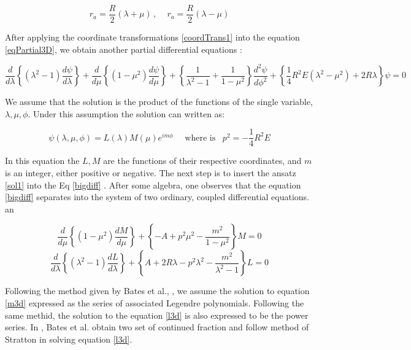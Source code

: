 \begin{equation}\label{coordTrans1}
r_a = \frac{R}{2}(\lambda + \mu)\,,\,\,\,\,\,\,\,r_a = \frac{R}{2}(\lambda - \mu)
\end{equation}

After applying the coordinate transformations \eqref{coordTrans1} into the equation \eqref {eqPartial3D}, we obtain another partial differential equations \cite{Bates1}:

\begin{equation}\label{bigdiff}
\frac{d}{d\lambda}\left\{(\lambda^2-1)\frac{d\psi}{d\lambda}\right\} +\frac{d}{d\mu}\left\{(1-\mu^2)\frac{d\psi}{d\mu}\right\} + \left\{\frac{1}{\lambda^2-1} + \frac{1}{1-\mu^2} \right\}\frac{d^2\psi}{d\phi^2}+ \left\{\frac{1}{4}R^2E(\lambda^2 - \mu^2) + 2R\lambda \right\}\psi = 0
\end{equation}

We assume that the solution is the product of the functions of the single variable, $\lambda,\mu, \phi $. Under this assumption the solution can written as:

\begin{equation}\label{sol1}
\psi(\lambda, \mu, \phi) = L(\lambda)M(\mu)e^{im\phi}\,\,\,\,\,\,\text{ where is }\,\,\,p^2 = -\frac{1}{4}R^2E
\end{equation}

In this equation the $ L, M $ are the functions of their respective coordinates, and $ m $ is an integer, either positive or negative. The next step is to insert the ansatz \eqref{sol1} into the Eq \eqref{bigdiff} .  After some algebra, one observes that the equation \eqref{bigdiff} separates into the system of two ordinary, coupled differential equations.
an

\begin{equation}\label{m3d}
\frac{d}{d\mu}\left\{(1-\mu^2)\frac{dM}{d\mu}\right\} + \left\{-A + p^2\mu^2 -\frac{m^2}{1-\mu^2} \right\}M = 0 
\end{equation}
\begin{equation}\label{l3d}
\frac{d}{d\lambda}\left\{(\lambda^2-1)\frac{dL}{d\lambda}\right\} + \left\{A + 2R\lambda - p^2\lambda^2 -\frac{m^2}{\lambda^2-1} \right\}L = 0 
\end{equation}

Following the method given by Bates et al., \cite{Bates1}, we assume the solution to equation \eqref{m3d} expressed as the series of associated Legendre polynomials. Following the same methid, the solution to the equation \eqref{l3d} is also expressed to be the power series. In \cite{Bates1}, Bates et al. obtain two set of continued fraction \cite[eq:14-17]{Bates1} and follow method of Stratton \cite{Stratton} in solving equation \eqref{l3d}. 


